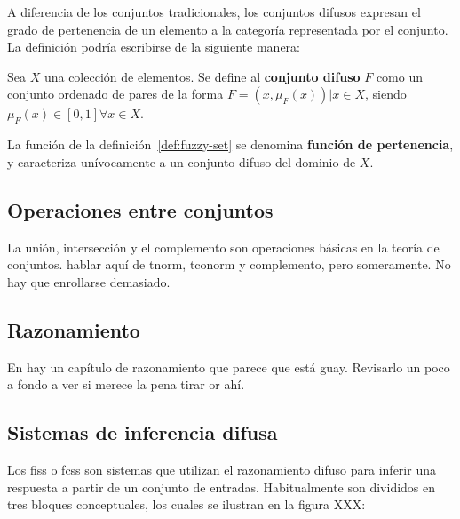 A diferencia de los conjuntos tradicionales, los conjuntos difusos expresan el grado de pertenencia de un elemento a la categoría representada por el conjunto. La definición podría escribirse de la siguiente manera:


\begin{definition}
	Sea $X$ una colección de elementos. Se define al \textbf{conjunto difuso} $F$ como un conjunto ordenado de pares de la forma $F = {(x, \mu_F(x)) | x \in X}$, siendo $\mu_F(x) \in [0, 1] \forall x \in X$.
	\label{def:fuzzy-set}
\end{definition}

La función de la definición~\ref{def:fuzzy-set} se denomina \textbf{función de pertenencia}, y caracteriza unívocamente a un conjunto difuso del dominio de $X$.


\subsection{Operaciones entre conjuntos}

La unión, intersección y el complemento son operaciones básicas en la teoría de conjuntos. \TODO hablar aquí de tnorm, tconorm y complemento, pero someramente. No hay que enrollarse demasiado.

\subsection{Razonamiento}

En \cite{Ma} hay un capítulo de razonamiento que parece que está guay. Revisarlo un poco a fondo a ver si merece la pena tirar or ahí.

\subsection{Sistemas de inferencia difusa}

Los \acp{fis} o \acp{fcs} son sistemas que utilizan el razonamiento difuso para inferir una respuesta a partir de un conjunto de entradas. Habitualmente son divididos en tres bloques conceptuales, los cuales se ilustran en la figura XXX:

